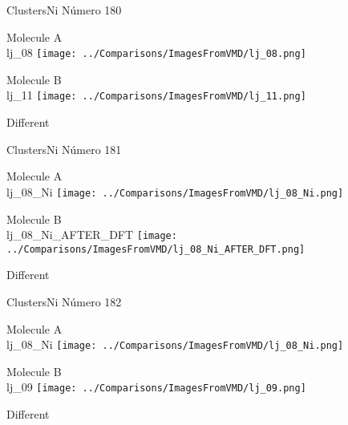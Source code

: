  \newpage

\vtab[-3cm]
\begin{center}
{\large ClustersNi \tab Número 180}
\end{center}
\begin{multicols}{2}
\begin{center}
Molecule A \\ 
lj\_08
\texttt{[image: ../Comparisons/ImagesFromVMD/lj\_08.png]}
\\
\vtab

\columnbreak
Molecule B \\ 
lj\_11
\texttt{[image: ../Comparisons/ImagesFromVMD/lj\_11.png]}
\\
\vtab


\end{center}
\end{multicols}
\begin{center}
\textcolor{NavyBlue}{\Large Different}
\end{center}

 \newpage

\vtab[-3cm]
\begin{center}
{\large ClustersNi \tab Número 181}
\end{center}
\begin{multicols}{2}
\begin{center}
Molecule A \\ 
lj\_08\_Ni
\texttt{[image: ../Comparisons/ImagesFromVMD/lj\_08\_Ni.png]}
\\
\vtab

\columnbreak
Molecule B \\ 
lj\_08\_Ni\_AFTER\_DFT
\texttt{[image: ../Comparisons/ImagesFromVMD/lj\_08\_Ni\_AFTER\_DFT.png]}
\\
\vtab


\end{center}
\end{multicols}
\begin{center}
\textcolor{NavyBlue}{\Large Different}
\end{center}

 \newpage

\vtab[-3cm]
\begin{center}
{\large ClustersNi \tab Número 182}
\end{center}
\begin{multicols}{2}
\begin{center}
Molecule A \\ 
lj\_08\_Ni
\texttt{[image: ../Comparisons/ImagesFromVMD/lj\_08\_Ni.png]}
\\
\vtab

\columnbreak
Molecule B \\ 
lj\_09
\texttt{[image: ../Comparisons/ImagesFromVMD/lj\_09.png]}
\\
\vtab


\end{center}
\end{multicols}
\begin{center}
\textcolor{NavyBlue}{\Large Different}
\end{center}

